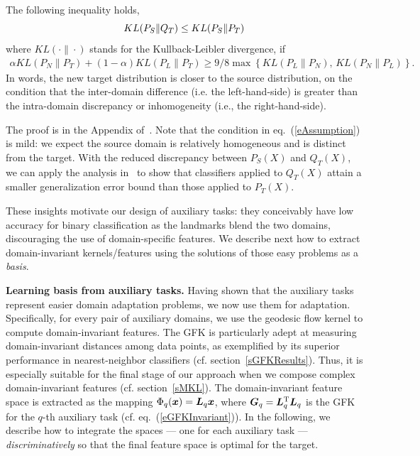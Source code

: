 \begin{thm}
\label{thAux}
The following inequality holds,
\begin{equation}
 KL( P_S  \|  Q_T ) \le  KL( P_S \|  P_T)  \notag
\end{equation}
where $KL(\cdot\|\cdot)$ stands for the Kullback-Leibler divergence, if %
\begin{align} \label{eAssumption}
\alpha KL(P_N\|P_{T})+(1-\alpha)KL(P_L\|P_{T}) 
    \geq {9}/{8}\max \left\{ KL(P_L\|P_N),\, KL(P_N\|P_L) \right\}.
\end{align}In words, the new target distribution is closer to the source distribution, on the condition that the inter-domain difference (i.e. the left-hand-side) is greater than the intra-domain discrepancy or inhomogeneity (i.e., the right-hand-side).
\end{thm}
The proof is in the Appendix of~\cite{GongIJCV14Learning}. Note that the condition in eq.~(\ref{eAssumption}) is mild:  we expect the source domain is relatively homogeneous and is distinct from the target. With the reduced discrepancy between $P_S(X)$ and $Q_T(X)$, we can apply the analysis in~\cite[Lemma~1]{mansour09multiple} to show that classifiers applied to $Q_T(X)$ attain a smaller generalization error bound than those applied to $P_T(X)$.

These insights motivate our design of auxiliary tasks: they conceivably have low accuracy for binary classification as the landmarks blend the two domains, discouraging the use of domain-specific features.  We describe next how to extract domain-invariant kernels/features using the solutions of those easy problems as a \emph{basis}.

{\bf Learning basis from auxiliary tasks.} {Having shown that the auxiliary tasks represent easier domain adaptation problems, we now use them for adaptation.  Specifically,} for every pair of auxiliary domains, we use the geodesic flow kernel to compute domain-invariant features. The GFK is particularly adept at measuring domain-invariant distances among data points, as exemplified by its superior performance in nearest-neighbor classifiers (cf. section~\ref{sGFKResults}). Thus, it is especially suitable for the final stage of our approach when we compose complex domain-invariant features (cf. section~\ref{sMKL}). The domain-invariant feature space is extracted as the mapping $\Phi_q(\boldsymbol{x}) = \boldsymbol{L}_q\boldsymbol{x}$, where $\boldsymbol{G}_q=\boldsymbol{L}_q^{\textrm T}\boldsymbol{L}_q$ is the GFK for the $q$-th auxiliary task (cf. eq.~(\ref{eGFKInvariant})).  In the following, we describe how to integrate the spaces --- one for each auxiliary task --- \emph{discriminatively} so that the final feature space is optimal for the target.

